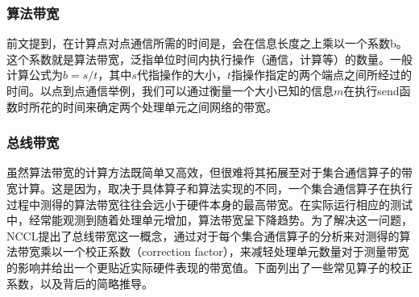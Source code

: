 \documentclass[letterpaper,10pt,english]{sphinxmanual}
\begin{document}
\subsubsection{算法带宽}
\label{\detokenize{chapter_distributed_training/collective:id11}}
\sphinxAtStartPar
前文提到，在计算点对点通信所需的时间是，会在信息长度之上乘以一个系数b。这个系数就是算法带宽，泛指单位时间内执行操作（通信，计算等）的数量。一般计算公式为\(b = s/t\)，其中\(s\)代指操作的大小，\(t\)指操作指定的两个端点之间所经过的时间。以点到点通信举例，我们可以通过衡量一个大小已知的信息\(m\)在执行send函数时所花的时间来确定两个处理单元之间网络的带宽。


\subsubsection{总线带宽}
\label{\detokenize{chapter_distributed_training/collective:id12}}
\sphinxAtStartPar
虽然算法带宽的计算方法既简单又高效，但很难将其拓展至对于集合通信算子的带宽计算。这是因为，取决于具体算子和算法实现的不同，一个集合通信算子在执行过程中测得的算法带宽往往会远小于硬件本身的最高带宽。在实际运行相应的测试中，经常能观测到随着处理单元增加，算法带宽呈下降趋势。为了解决这一问题，NCCL提出了总线带宽这一概念，通过对于每个集合通信算子的分析来对测得的算法带宽乘以一个校正系数（correction
factor），来减轻处理单元数量对于测量带宽的影响并给出一个更贴近实际硬件表现的带宽值。下面列出了一些常见算子的校正系数，以及背后的简略推导。
\end{document}
